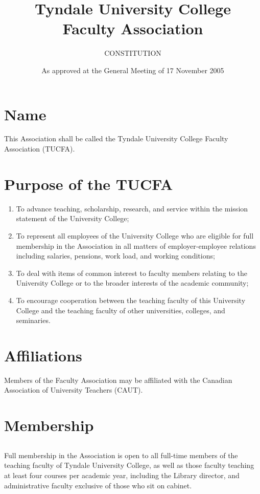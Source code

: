 \documentclass[12pt]{article}
\title{Tyndale University College\\Faculty Association}
\author{CONSTITUTION}
\date{%
  As approved at the General Meeting of 17 November 2005
}
\begin{document}
\maketitle

\section{Name}

This Association shall be called the Tyndale University College Faculty Association (TUCFA).

\section{Purpose of the TUCFA}

\begin{enumerate}
\item
To advance teaching, scholarship, research, and service within the mission statement of the University College;
\item
To represent all employees of the University College who are eligible for full membership in the Association in all matters of employer-employee relations including salaries, pensions, work load, and working conditions;
\item
To deal with items of common interest to faculty members relating to the University College or to the broader interests of the academic community;
\item
To encourage cooperation between the teaching faculty of this University College and the teaching faculty of other universities, colleges, and seminaries.
\end{enumerate}

\section{Affiliations}

Members of the Faculty Association may be affiliated with the Canadian Association of University Teachers (CAUT).

\section{Membership}

\subsection{}

Full membership in the Association is open to all full-time members of the teaching faculty of Tyndale University College, as well as those faculty teaching at least four courses per academic year, including the Library director, and administrative faculty exclusive of those who sit on cabinet.
\end{document}
